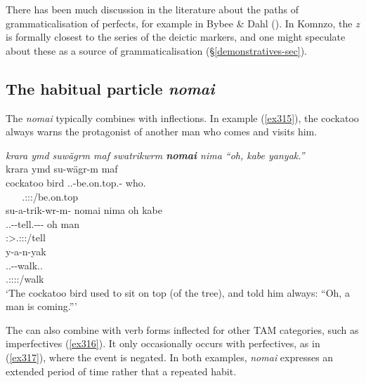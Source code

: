 There has been much discussion in the literature about the paths of grammaticalisation of perfects, for example in Bybee \& Dahl (\citeyear{Bybee:1989hk}). In Komnzo, the   \emph{z} is formally closest to the  series of the deictic markers, and one might speculate about these as a source of grammaticalisation (\S\ref{demonstratives-sec}).

\subsection{The habitual particle \emph{nomai}}\label{habitualnomai}

The   \emph{nomai} typically combines with  inflections. In example (\ref{ex315}), the cockatoo always warns the protagonist of another man who comes and visits him.

\begin{exe}
	\ex \emph{krara ymd suwägrm maf swatrikwrm \textbf{nomai} nima ``oh, kabe yanyak.''}\\
	\glll krara ymd su-wägr-m maf\\
	cockatoo bird \Tsg.\Masc.\Betaone-be.on.top.\Ndu-\Dur{} who.{\Erg}\\
	~ ~ {\footnotesize \Tsg.\Masc:\Sbj:\Pst:\Dur/be.on.top} ~\\
	\sn
	\glll su-a-trik-wr-m-\Zero{} nomai nima oh kabe\\
	\Tsg.\Masc.\Betaone-\Vc-tell.\Ext-\Ndu-\Dur-\Stsg{} \Hab{} {\Quot} oh man\\
	{\footnotesize \Stsg:\Sbj>\Tsg.\Masc:\Io:\Pst:\Dur/tell} ~ ~ ~ ~\\
	\sn
	\glll y-a-n-yak\\
	\Tsg.\Masc.\Alph-\Venit-walk.\Ext.{\Ndu}\\
	{\footnotesize \Tsg.\Masc:\Sbj:\Nonpast:\Ipfv:\Venit/walk}\\
	\trans `The cockatoo bird used to sit on top (of the tree), and told him always: ``Oh, a man is coming.''' 
	\label{ex315}
\end{exe}

The  can also combine with verb forms inflected for other TAM categories, such as imperfectives (\ref{ex316}). It only occasionally occurs with perfectives, as in (\ref{ex317}), where the event is negated. In both examples, \emph{nomai} expresses an extended period of time rather that a repeated habit.

